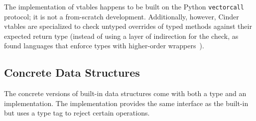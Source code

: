 \documentclass[english,cleveref,submission]{programming}
\newcommand{\code}[1]{\texttt{#1}}
\begin{document}
The implementation of vtables happens to be built on the Python \code{vectorcall}
protocol; it is not a from-scratch development.
Additionally, however, Cinder vtables are specialized to check untyped overrides
of typed methods against their expected return type (instead of using a layer of
indirection for the check, as found languages that enforce types with higher-order
wrappers~\cite{clzv-ecoop-2018,gf-icfp-2018}).




\subsection{Concrete Data Structures}
\label{s:chkdict-impl}

The concrete versions of built-in data structures come with both a type and an
implementation.
The implementation provides the same interface as the built-in but uses a
type tag to reject certain operations.
\end{document}
